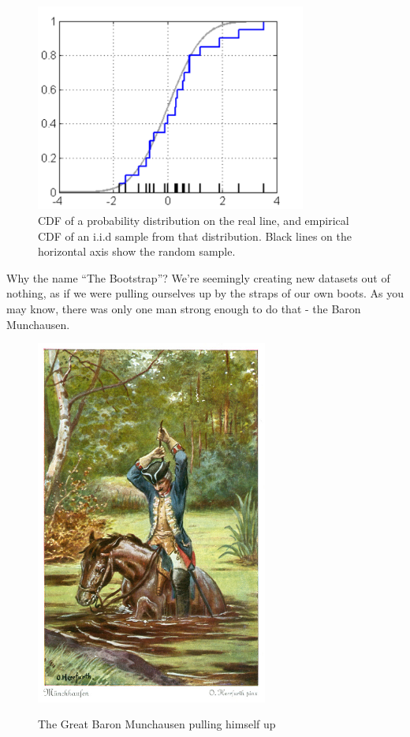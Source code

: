 \documentclass[11pt]{article}
\begin{document}
\begin{figure}[H]
  \centering
  \includegraphics[width=3.5in]{ecdf.pdf}  
  \caption{CDF of a probability distribution on the real line, and empirical CDF
  of an i.i.d sample from that distribution. Black lines on the horizontal axis
show the random sample. }
\label{ecdf}
\end{figure}







\noindent Why the name ``The Bootstrap''? We're seemingly creating new datasets out of nothing, as if we
were pulling ourselves up by the straps of our own boots. As you may know, there was only one man
strong enough to do that - the Baron Munchausen.

\begin{figure}[h!]
  \centering
  \includegraphics[width=3in]{munchausen.jpg}  \\
  \caption{The Great Baron Munchausen pulling himself up}
\end{figure}
\end{document}
